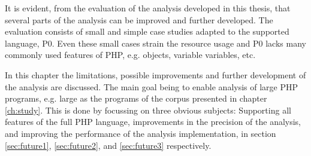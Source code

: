 It is evident, from the evaluation of the analysis developed in this thesis, that several parts of the analysis can be improved and further developed. The evaluation consists of small and simple case studies adapted to the supported language, P0. Even these small cases strain the resource usage and P0 lacks many commonly used features of PHP, e.g. objects, variable variables, etc. 

In this chapter the limitations, possible improvements and further development of the analysis are discussed. The main goal being to enable analysis of large PHP programs, e.g. large as the programs of the corpus presented in chapter \ref{ch:study}. This is done by focussing on three obvious subjects: Supporting all features of the full PHP language, improvements in the precision of the analysis, and improving the performance of the analysis implementation, in section \ref{sec:future1}, \ref{sec:future2}, and \ref{sec:future3} respectively. 